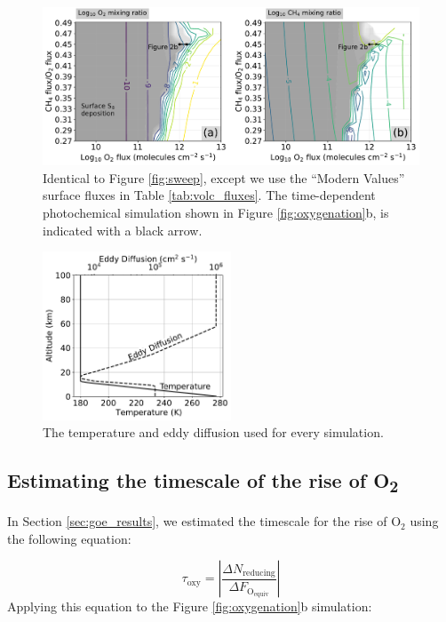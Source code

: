 \begin{figure}
  \centering
  \includegraphics[width=\textwidth]{tex/4goe/supplement/figures/ModernValues_sweep.pdf}
  \caption{Identical to Figure \ref{fig:sweep}, except we use the ``Modern Values'' surface fluxes in Table \ref{tab:volc_fluxes}. The time-dependent photochemical simulation shown in Figure \ref{fig:oxygenation}b, is indicated with a black arrow.}
  \label{fig:case1}
\end{figure}
  
\begin{figure}
  \centering
  \includegraphics[width=0.5\textwidth]{tex/4goe/supplement/figures/A1_temp_eddy.pdf}
  \caption{The temperature and eddy diffusion used for every simulation.}
  \label{fig:eddy_temp}
\end{figure}

\subsection{Estimating the timescale of the rise of O\textsubscript{2}}

In Section \ref{sec:goe_results}, we estimated the timescale for the rise of O$_2$ using the following equation:

\begin{equation} \label{eq:tau_oxy_SI}
    \tau_\text{oxy} = \left| \frac{\Delta N_\text{reducing}}{\Delta F_\mathrm{O_{equiv}}} \right|
\end{equation}
Applying this equation to the Figure \ref{fig:oxygenation}b simulation:

